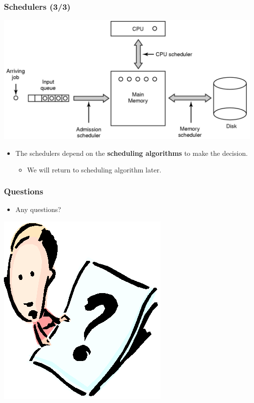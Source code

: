 \documentclass[CJKutf8,xcolor=pdftex,dvipsnames,table]{beamer}
\begin{document}
\begin{CJK*}{UTF8}{song}
\begin{frame}
  \end{frame}

  \begin{frame}
  \frametitle{Schedulers (3/3)} \pause
  \begin{center}
    \includegraphics[scale=0.2]{mosv2f2-40} \pause
  \end{center}
  \begin{itemize}
  \item{The schedulers depend on the \textbf{scheduling algorithms} to make the decision.} \pause
    \begin{itemize}
    \item{We will return to scheduling algorithm later.}
    \end{itemize}
  \end{itemize}
  \end{frame}
  
\fi

  \begin{frame}
  \frametitle{Questions}
  \begin{itemize}
  \item{Any questions?}
  \end{itemize}
  \begin{center}
    \includegraphics[scale=.5]{question}
  \end{center}
  \end{frame}


\end{CJK*}
\end{document}
